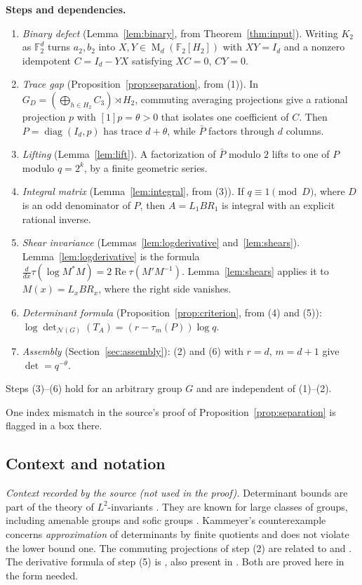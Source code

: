 \documentclass[11pt]{article}
\theoremstyle{remark}
\numberwithin{equation}{section}
\newcommand{\F}{\mathbb F}
\newcommand{\Mat}{\operatorname{M}}
\newcommand{\diag}{\operatorname{diag}}
\newcommand{\N}{\mathcal N}
\begin{document}
\textbf{Steps and dependencies.}
\begin{enumerate}[label=(\arabic*),leftmargin=2.2em,itemsep=2pt]
\item \emph{Binary defect} (Lemma~\ref{lem:binary}, from Theorem~\ref{thm:input}). Writing $K_2$ as $\F_2^d$ turns $a_2,b_2$ into $X,Y\in\Mat_d(\F_2[H_2])$ with $XY=I_d$ and a nonzero idempotent $C=I_d-YX$ satisfying $XC=0$, $CY=0$.
\item \emph{Trace gap} (Proposition~\ref{prop:separation}, from (1)). In $G_D=(\bigoplus_{h\in H_2}C_3)\rtimes H_2$, commuting averaging projections give a rational projection $p$ with $[1]p=\theta>0$ that isolates one coefficient of $C$. Then $P=\diag(I_d,p)$ has trace $d+\theta$, while $\bar P$ factors through $d$ columns.
\item \emph{Lifting} (Lemma~\ref{lem:lift}). A factorization of $\bar P$ modulo $2$ lifts to one of $P$ modulo $q=2^k$, by a finite geometric series.
\item \emph{Integral matrix} (Lemma~\ref{lem:integral}, from (3)). If $q\equiv1\pmod D$, where $D$ is an odd denominator of $P$, then $A=L_1BR_1$ is integral with an explicit rational inverse.
\item \emph{Shear invariance} (Lemmas~\ref{lem:logderivative} and~\ref{lem:shears}). Lemma~\ref{lem:logderivative} is the formula $\frac{d}{dx}\tau(\log M^*M)=2\operatorname{Re}\tau(M'M^{-1})$. Lemma~\ref{lem:shears} applies it to $M(x)=L_xBR_x$, where the right side vanishes.
\item \emph{Determinant formula} (Proposition~\ref{prop:criterion}, from (4) and (5)): $\log\det_{\N(G)}(T_A)=(r-\tau_m(P))\log q$.
\item \emph{Assembly} (Section~\ref{sec:assembly}): (2) and (6) with $r=d$, $m=d+1$ give $\det=q^{-\theta}$.
\end{enumerate}
Steps (3)--(6) hold for an arbitrary group $G$ and are independent of (1)--(2).

One index mismatch in the source's proof of Proposition~\ref{prop:separation} is flagged in a box there.

\subsection{Context and notation}

\emph{Context recorded by the source (not used in the proof).} Determinant bounds are part of the theory of $L^2$-invariants \cite{Luck2002}. They are known for large classes of groups, including amenable groups \cite[Theorem 1.21, with its erratum]{Schick2001} and sofic groups \cite[Theorem 5]{ElekSzabo2005}. Kammeyer's counterexample \cite[Theorem 2 and Section 2]{Kammeyer2026} concerns \emph{approximation} of determinants by finite quotients and does not violate the lower bound one. The commuting projections of step (2) are related to \cite[Section 3]{DicksSchick2002} and \cite[Section 2]{LehnerNeuhauserWoess2008}. The derivative formula of step (5) is \cite[Lemma 2]{FK1952}, also present in \cite[Lemma 1 and Proposition 2(d)]{deLaHarpeSkandalis1984}. Both are proved here in the form needed.
\end{document}

